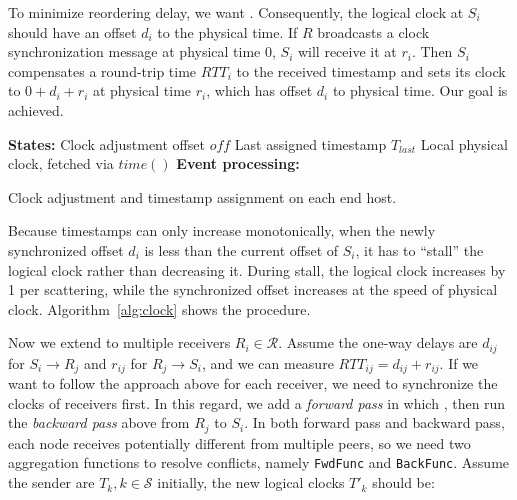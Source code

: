 To minimize reordering delay, we want .
Consequently, the logical clock at $S_i$ should have an offset $d_i$ to the physical time.
If $R$ broadcasts a clock synchronization message at physical time 0, $S_i$ will receive it at $r_i$.
Then $S_i$ compensates a round-trip time $RTT_i$ to the received timestamp and sets its clock to $0 + d_i + r_i$ at physical time $r_i$, which has offset $d_i$ to physical time.
Our goal is achieved.


\begin{algorithm}[t]
 \DontPrintSemicolon
 \textbf{States:} Clock adjustment offset $off$\;
 \qquad Last assigned timestamp $T_{last}$\;
 \qquad Local physical clock, fetched via $time()$\;
 \textbf{Event processing:}\;
 \caption{Clock adjustment and timestamp assignment on each end host.}
 \label{alg:clock}
\end{algorithm}



Because timestamps can only increase monotonically, when the newly synchronized offset $d_i$ is less than the current offset of $S_i$, it has to ``stall'' the logical clock rather than decreasing it.
During stall, the logical clock increases by 1 per scattering, while the synchronized offset increases at the speed of physical clock.
Algorithm~\ref{alg:clock} shows the procedure.

Now we extend to multiple receivers $R_i \in \mathcal{R}$.
Assume the one-way delays are $d_{ij}$ for $S_i \rightarrow R_j$ and $r_{ij}$ for $R_j \rightarrow S_i$, and we can measure $RTT_{ij} = d_{ij} + r_{ij}$.
If we want to follow the approach above for each receiver, we need to synchronize the clocks of receivers first.
In this regard, we add a \textit{forward pass} in which , then run the \textit{backward pass} above from $R_j$ to $S_i$.
In both forward pass and backward pass, each node receives potentially different  from multiple peers, so we need two aggregation functions to resolve conflicts, namely \texttt{FwdFunc} and \texttt{BackFunc}.
Assume the sender  are $T_k, k \in \mathcal{S}$ initially, the new logical clocks $T'_k$ should be:

